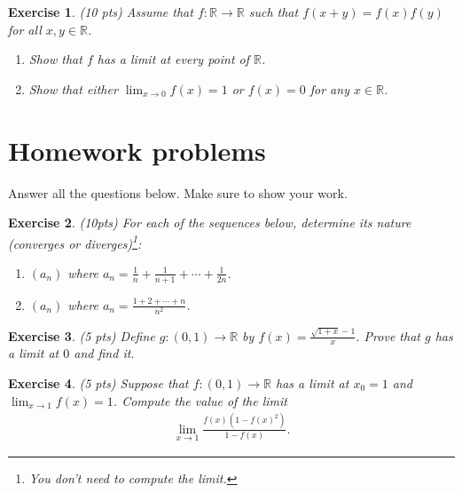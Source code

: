 \documentclass[12pt]{article}
\newcommand{\bR}{\mathbb{R}}
\newcommand{\ra}{\rightarrow}
\theoremstyle{plain}
\newtheorem{exer}{\textbf{Exercise}}}
\theoremstyle{plain}
\begin{document}
\begin{exer}
(10 pts)
Assume that $f : \bR \ra \bR$ such that $f(x + y) = f(x) f(y)$ for all $x, y \in \bR$.
	\begin{enumerate}[label=\textbf{\alph*)}]
	\item Show that $f$ has a limit at every point of $\bR$.
	\item Show that either $\lim_{x \ra 0} f(x) = 1$ or $f(x) = 0$ for any $x \in \bR$.
	\end{enumerate}
\end{exer}

\section{Homework problems}
Answer all the questions below. Make sure to show your work.

\begin{exer}
(10pts)
For each of the sequences below, determine its nature (converges or diverges)\footnote{You don't need to compute the limit.}:
	\begin{enumerate}[label=\textbf{\alph*)}]
	\item $(a_n)$ where $a_n = \frac{1}{n} + \frac{1}{n + 1} + \cdots + \frac{1}{2n}$.
	\item $(a_n)$ where $a_n = \frac{1 + 2 + \cdots + n}{n^2}$.
	\end{enumerate}
\end{exer}


\begin{exer}
(5 pts)
Define $g: (0, 1) \ra \bR$ by $f(x) = \frac{\sqrt{1 + x} - 1}{x}$. Prove that $g$ has a limit at $0$ and find it.
\end{exer}

\begin{exer}
(5 pts)
Suppose that $f: (0, 1) \ra \bR$ has a limit at $x_0 = 1$ and $\lim_{x \ra 1} f(x) = 1$. Compute the value of the limit
	\begin{align*}
	\lim_{x \ra 1} \frac{f(x) (1 - f(x)^2)}{1 - f(x)} .
	\end{align*}
\end{exer}
\end{document}
